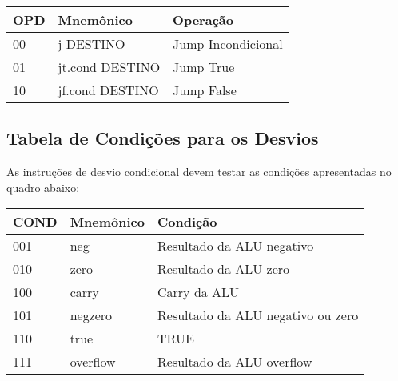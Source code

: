 \documentclass{report}
\begin{document}
   \FloatBarrier
    \begin{table}[H]
      \begin{center}
        \begin{tabular}[pos]{|m{4cm}|m{4cm}|m{8cm}|} 
          \hline
          \cellcolor[gray]{0.9}\textbf{OPD} & 
          \cellcolor[gray]{0.9}\textbf{Mnemônico} &
          \cellcolor[gray]{0.9}\textbf{Operação} \\ \hline
            00 & j DESTINO & Jump Incondicional \\ \hline
            01 & jt.cond DESTINO & Jump True \\ \hline
            10 & jf.cond DESTINO & Jump False \\ \hline
        \end{tabular}
      \end{center}
    \end{table}  
  
  
\subsection{Tabela de Condições para os Desvios}
As instruções de desvio condicional devem testar as condições apresentadas no quadro abaixo:

   \FloatBarrier
    \begin{table}[H]
      \begin{center}
        \begin{tabular}[pos]{|m{2cm}|m{3cm}|m{8cm}|} 
          \hline
          \cellcolor[gray]{0.9}\textbf{COND} & 
          \cellcolor[gray]{0.9}\textbf{Mnemônico} &
          \cellcolor[gray]{0.9}\textbf{Condição}  \\ \hline
            001 & neg & Resultado da ALU negativo \\ \hline
            010 & zero & Resultado da ALU zero \\ \hline
            100 & carry & Carry da ALU \\ \hline
            101 & negzero & Resultado da ALU negativo ou zero \\ \hline
            110 & true & TRUE \\ \hline
            111 & overflow & Resultado da ALU overflow \\ \hline
        \end{tabular}
      \end{center}
    \end{table}  
\end{document}
